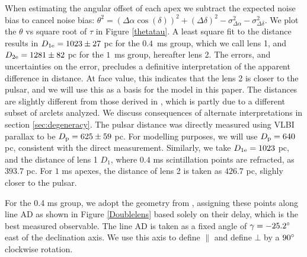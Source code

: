 \documentclass[useAMS,usenatbib]{mn2e}
\begin{document}
When estimating the
angular offset of each apex
we subtract the expected noise bias to cancel noise bias:
${\theta}^2=({\Delta\alpha}\cos(\delta))^2+({\Delta\delta})^2-\sigma^2_{\Delta\alpha}-\sigma^2_{\Delta\delta}$. 
We plot the $\theta$ vs square root of $\tau$ in Figure
\ref{thetatau}. A least square fit to the distance results in
$D_{1{\rm e}}=1023\pm 27$ pc for the  $0.4$\ ms group, which we call lens 1, and
$D_{2{\rm e}} = 1281 \pm 82$ pc for the $1$\ ms group, hereafter lens 2.
The errors, and uncertainties on the error, precludes a definitive
interpretation of the apparent difference in distance.  At face value, 
this indicates that the lens 2 is closer to the pulsar, and we will
use this as a basis for the model in this paper.  
The distances are slightly different from those derived in
\citet{2010ApJ...708..232B}, which is partly due to a different subset
of arclets analyzed. We discuss
consequences of alternate interpretations in section \ref{sec:degeneracy}.
The pulsar distance was directly measured using VLBI parallax to be
$D_{\rm p} = 625 \pm 59$ pc.  For modelling purposes, we will use
$D_{\rm p} = 640$ pc, consistent with the direct measurement.  Similarly,
we take $D_{1{\rm e}}=1023$ pc,  and the distance of lens 1 $D_{1}$,
where $0.4$ ms scintillation points are refracted, as $393.7$
pc. For $1$ ms apexes, the distance of lens 2 is taken as $426.7$ pc,
slighly closer to the pulsar.


For the 0.4 ms group, we adopt the geometry from
\citet{2010ApJ...708..232B}, assigning these points along line AD as
shown in Figure \ref{Doublelens} based solely on their delay, which is
the best measured observable. The line AD is taken as a
fixed angle of $\gamma=-25.2\degree$ east of the
declination axis. We use this axis
to define ${\parallel}$ and define ${\bot}$ by a $90\degree$ clockwise
rotation.  
\end{document}
